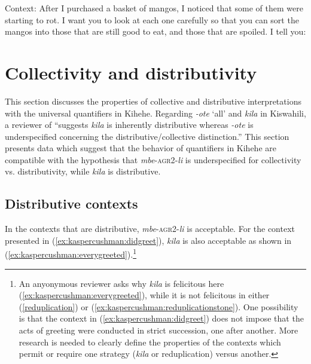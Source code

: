 \documentclass[output=paper,modfonts,nonflat]{langsci/langscibook}
\begin{document}
\pagebreak
\begin{exe}

 \ex Context: After I purchased a basket of mangos, I noticed that some of them were starting to rot. I want you to look at each one carefully so that you can sort the mangos into those that are still good to eat, and those that are spoiled. I tell you: \label{ex:kaspercushman:onebyone} \\

\begin{xlist}


\end{xlist}
\end{exe}


\section{Collectivity and distributivity}
\label{sec:kaspercushman:4}

This section discusses the properties of collective and distributive interpretations with the universal quantifiers in Kihehe. 
Regarding \textit{-ote} `all' and \textit{kila} in Kiswahili, a reviewer of \cite[396]{zerbian08} ``suggests \textit{kila} is inherently distributive whereas \textit{-ote} is underspecified concerning the distributive/collective distinction.''  This section presents data which suggest that the behavior of quantifiers in Kihehe are compatible with the hypothesis that \textit{mbe}-\textsc{agr2}-\textit{li} is underspecified for collectivity vs. distributivity, while \textit{kila} is distributive.

\subsection{Distributive contexts}

In the contexts that are distributive, \textit{mbe}-\textsc{agr2}-\textit{li} is acceptable. For the context presented in (\ref{ex:kaspercushman:didgreet}), \textit{kila} is also acceptable as shown in  (\ref{ex:kaspercushman:everygreeted}).\footnote{An anyonymous reviewer asks why \textit{kila} is felicitous here (\ref{ex:kaspercushman:everygreeted}), while it is not felicitous in either (\ref{reduplication}) or (\ref{ex:kaspercushman:reduplicationstone}). One possibility is that the context in (\ref{ex:kaspercushman:didgreet}) does not impose that the acts of greeting were conducted in strict succession, one after another.  More research is needed to clearly define the properties of the contexts which permit or require one strategy (\textit{kila} or reduplication) versus another.} 
\end{document}
